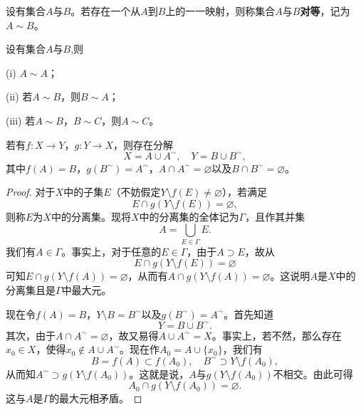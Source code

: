 \documentclass[lang=cn,newtx,10pt,scheme=chinese]{../Template/elegantbook}
\begin{document}
\begin{definition}[集合之间的对等关系]\label{definition:集合之间的对等关系}
  设有集合\(A\)与\(B\)。若存在一个从\(A\)到\(B\)上的一一映射，则称集合\(A\)与\(B\)\textbf{对等}，记为\(A\sim B\)。
\end{definition}

\begin{proposition}[对等关系的基本性质]\label{proposition:对等关系的基本性质}
设有集合\(A\)与\(B\),则

  (i) \(A\sim A\)；

(ii) 若\(A\sim B\)，则\(B\sim A\)；

(iii) 若\(A\sim B\)，\(B\sim C\)，则\(A\sim C\)。
\end{proposition}

\begin{lemma}[映射分解定理]\label{lemma:映射分解定理}
若有\(f:X\rightarrow Y\)，\(g:Y\rightarrow X\)，则存在分解
\[X = A\cup A^{\sim}, \quad Y = B\cup B^{\sim},\]
其中\(f(A)=B\)，\(g(B^{\sim})=A^{\sim}\)，\(A\cap A^{\sim}=\varnothing\)以及\(B\cap B^{\sim}=\varnothing\)。
\end{lemma}
\begin{proof}
  对于\(X\)中的子集\(E\)（不妨假定\(Y\setminus f(E)\neq\varnothing\)），若满足
\[E\cap g(Y\setminus f(E)) = \varnothing,\]
则称\(E\)为\(X\)中的分离集。现将\(X\)中的分离集的全体记为\(\Gamma\)，且作其并集
\[A = \bigcup_{E\in\Gamma}E.\]
我们有\(A\in\Gamma\)。事实上，对于任意的\(E\in\Gamma\)，由于\(A\supset E\)，故从
\[E\cap g(Y\setminus f(E)) = \varnothing\]
可知\(E\cap g(Y\setminus f(A)) = \varnothing\)，从而有\(A\cap g(Y\setminus f(A)) = \varnothing\)。这说明\(A\)是\(X\)中的分离集且是\(\Gamma\)中最大元。

现在令\(f(A)=B\)，\(Y\setminus B = B^{\sim}\)以及\(g(B^{\sim}) = A^{\sim}\)。首先知道
\[Y = B\cup B^{\sim}.\]
其次，由于\(A\cap A^{\sim} = \varnothing\)，故又易得\(A\cup A^{\sim} = X\)。事实上，若不然，那么存在\(x_0\in X\)，使得\(x_0\notin A\cup A^{\sim}\)。现在作\(A_0 = A\cup\{x_0\}\)，我们有
\[B = f(A)\subset f(A_0), \quad B^{\sim}\supset Y\setminus f(A_0),\]
从而知\(A^{\sim}\supset g(Y\setminus f(A_0))\)。这就是说，\(A\)与\(g(Y\setminus f(A_0))\)不相交。由此可得
\[A_0\cap g(Y\setminus f(A_0)) = \varnothing.\]
这与\(A\)是\(\Gamma\)的最大元相矛盾。
\end{proof}
\end{document}
